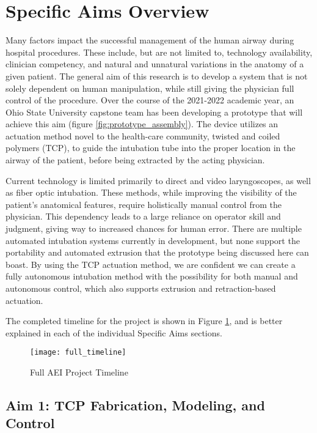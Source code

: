 \section*{Specific Aims Overview}
\label{parts:specific_aims_overview}

	Many factors impact the successful management of the human airway during hospital procedures. These include, but are not limited to, technology availability, clinician competency, and natural and unnatural variations in the anatomy of a given patient. The general aim of this research is to develop a system that is not solely dependent on human manipulation, while still giving the physician full control of the procedure. Over the course of the 2021-2022 academic year, an Ohio State University capstone team has been developing a prototype that will achieve this aim (figure \ref{fig:prototype_assembly}). The device utilizes an actuation method novel to the health-care community, twisted and coiled polymers (TCP), to guide the intubation tube into the proper location in the airway of the patient, before being extracted by the acting physician.

	Current technology is limited primarily to direct and video laryngoscopes, as well as fiber optic intubation. These methods, while improving the visibility of the patient's anatomical features, require holistically manual control from the physician. This dependency leads to a large reliance on operator skill and judgment, giving way to increased chances for human error. There are multiple automated intubation systems currently in development, but none support the portability and automated extrusion that the prototype being discussed here can boast. By using the TCP actuation method, we are confident we can create a fully autonomous intubation method with the possibility for both manual and autonomous control, which also supports extrusion and retraction-based actuation.

	The completed timeline for the project is shown in Figure \ref{fig:full_timeline}, and is better explained in each of the individual Specific Aims sections.

	\begin{figure}[ht]
		\centering
		\texttt{[image: full\_timeline]}
		\caption{Full AEI Project Timeline}
		\label{fig:full_timeline}
	\end{figure}

	\subsection{Aim 1: TCP Fabrication, Modeling, and Control}
	\label{subsect:aim1}
	
